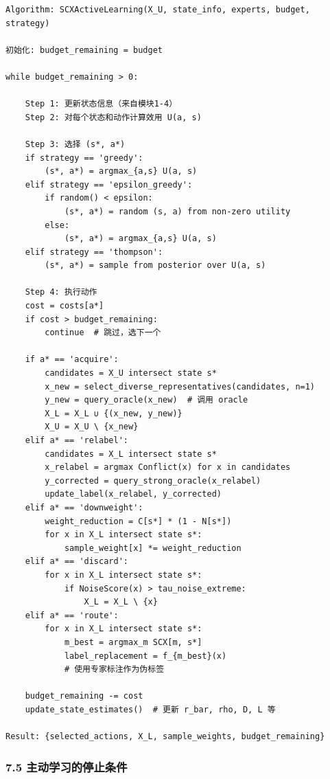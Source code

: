 \documentclass[
  12pt,
]{ctexart}
\begin{document}
\begin{verbatim}
Algorithm: SCXActiveLearning(X_U, state_info, experts, budget, strategy)

初始化: budget_remaining = budget

while budget_remaining > 0:

    Step 1: 更新状态信息（来自模块1-4）
    Step 2: 对每个状态和动作计算效用 U(a, s)

    Step 3: 选择 (s*, a*)
    if strategy == 'greedy':
        (s*, a*) = argmax_{a,s} U(a, s)
    elif strategy == 'epsilon_greedy':
        if random() < epsilon:
            (s*, a*) = random (s, a) from non-zero utility
        else:
            (s*, a*) = argmax_{a,s} U(a, s)
    elif strategy == 'thompson':
        (s*, a*) = sample from posterior over U(a, s)

    Step 4: 执行动作
    cost = costs[a*]
    if cost > budget_remaining:
        continue  # 跳过，选下一个

    if a* == 'acquire':
        candidates = X_U intersect state s*
        x_new = select_diverse_representatives(candidates, n=1)
        y_new = query_oracle(x_new)  # 调用 oracle
        X_L = X_L ∪ {(x_new, y_new)}
        X_U = X_U \ {x_new}
    elif a* == 'relabel':
        candidates = X_L intersect state s*
        x_relabel = argmax Conflict(x) for x in candidates
        y_corrected = query_strong_oracle(x_relabel)
        update_label(x_relabel, y_corrected)
    elif a* == 'downweight':
        weight_reduction = C[s*] * (1 - N[s*])
        for x in X_L intersect state s*:
            sample_weight[x] *= weight_reduction
    elif a* == 'discard':
        for x in X_L intersect state s*:
            if NoiseScore(x) > tau_noise_extreme:
                X_L = X_L \ {x}
    elif a* == 'route':
        for x in X_L intersect state s*:
            m_best = argmax_m SCX[m, s*]
            label_replacement = f_{m_best}(x)
            # 使用专家标注作为伪标签

    budget_remaining -= cost
    update_state_estimates()  # 更新 r_bar, rho, D, L 等

Result: {selected_actions, X_L, sample_weights, budget_remaining}
\end{verbatim}

\subsubsection{7.5
主动学习的停止条件}\label{ux4e3bux52a8ux5b66ux4e60ux7684ux505cux6b62ux6761ux4ef6}
\end{document}
